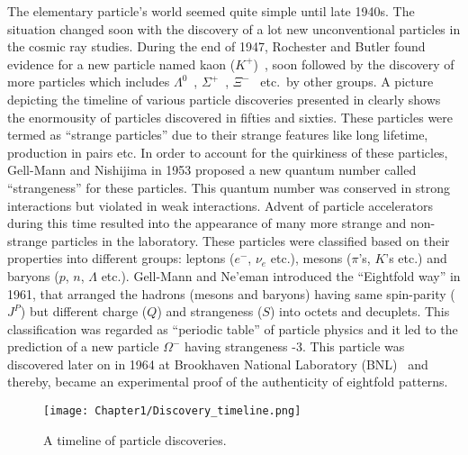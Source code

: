 The elementary particle's world seemed quite simple until late 1940s. The situation changed soon with the discovery of a lot new unconventional particles
in the cosmic ray studies. During the end of 1947, Rochester and Butler found evidence for a new particle named kaon ($K^{+}$)~\cite{Rochester:1947mi},
soon followed by the discovery
of more particles which includes $\Lambda^{0}$~\cite{PhysRev.80.1099}, $\Sigma^{+}$~\cite{Bonetti1953, PhysRev.90.167}, $\Xi^{-}$~\cite{cowan1954v} etc.\ by other groups.
A picture depicting the timeline of various particle discoveries
presented in \fig{\ref{fig:Discovery_timeline}} clearly shows the enormousity of particles discovered in fifties and sixties. These particles were termed as
``strange particles'' due to their strange features like long lifetime, production in pairs etc. In order to account for the quirkiness of these particles,
Gell-Mann and Nishijima in 1953 proposed a new quantum number called ``strangeness'' for these particles. This quantum number was conserved in strong interactions
but violated in weak interactions. Advent of particle accelerators during this time resulted into the appearance of many more strange and non-strange
particles in the laboratory. These particles were classified based on their properties into different groups: leptons ($e^{-}$, $\nu_{e}$ etc.),
mesons ($\pi$'s, $K$'s etc.) and baryons ($p$, $n$, $\Lambda$ etc.). Gell-Mann and Ne'eman
introduced the ``Eightfold way'' in 1961, that arranged the hadrons (mesons and baryons) having same spin-parity ($J^{P}$) but different charge ($Q$) and
strangeness ($S$) into octets and decuplets. This classification was regarded as ``periodic table'' of particle
physics and it led to the prediction of a new particle $\Omega^{-}$ having strangeness -3. This particle was discovered later on in 1964 at
Brookhaven National Laboratory (BNL)~\cite{Barnes:1964pd} and thereby, became an experimental proof of the authenticity of eightfold patterns.

\begin{figure}[h]
\begin{center}
\texttt{[image: Chapter1/Discovery\_timeline.png]}
\caption{A timeline of particle discoveries.}
\label{fig:Discovery_timeline}
\end{center}
\end{figure}

